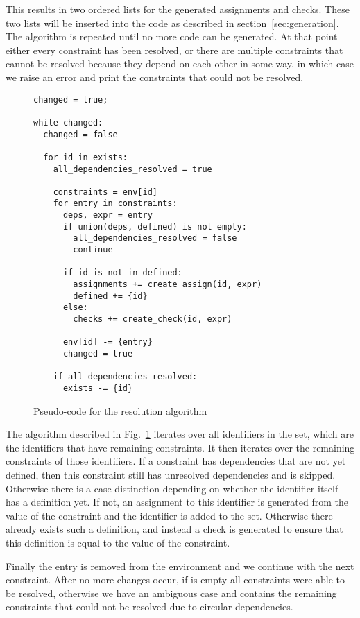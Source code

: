 \noindent
This results in two ordered lists for the generated assignments and checks.
These two lists will be inserted into the code as described in section~\ref{sec:generation}.
The algorithm is repeated until no more code can be generated.
At that point either every constraint has been resolved, or there are multiple constraints that cannot be resolved because they depend on each other in some way, in which case we raise an error and print the constraints that could not be resolved.

\begin{figure}[hbt]
\begin{lstlisting}[language=pseudocode]
changed = true;

while changed:
  changed = false

  for id in exists:
    all_dependencies_resolved = true

    constraints = env[id]
    for entry in constraints:
      deps, expr = entry
      if union(deps, defined) is not empty:
        all_dependencies_resolved = false
        continue

      if id is not in defined:
        assignments += create_assign(id, expr)
        defined += {id}
      else:
        checks += create_check(id, expr)

      env[id] -= {entry}
      changed = true

    if all_dependencies_resolved:
      exists -= {id}
\end{lstlisting}
\caption{Pseudo-code for the resolution algorithm}
\label{fig:resolution-algorithm}
\end{figure}

The algorithm described in Fig.~\ref{fig:resolution-algorithm} iterates over all identifiers in the \exists{} set, which are the identifiers that have remaining constraints.
It then iterates over the remaining constraints of those identifiers.
If a constraint has dependencies that are not yet defined, then this constraint still has unresolved dependencies and is skipped.
Otherwise there is a case distinction depending on whether the identifier itself has a definition yet.
If not, an assignment to this identifier is generated from the value of the constraint and the identifier is added to the  set.
Otherwise there already exists such a definition, and instead a check is generated to ensure that this definition is equal to the value of the constraint.

Finally the entry is removed from the environment and we continue with the next constraint.
After no more changes occur, if \exists{} is empty all constraints were able to be resolved, otherwise we have an ambiguous case and \exists{} contains the remaining constraints that could not be resolved due to circular dependencies.

